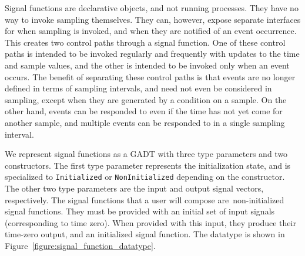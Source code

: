 Signal functions are declarative objects, and not running processes. They have
no way to invoke sampling themselves. They can, however, expose separate
interfaces for when sampling is invoked, and when they are notified of an event
occurrence. This creates two control paths through a signal function. One of
these control paths is intended to be invoked regularly and frequently with
updates to the time and sample values, and the other is intended to be invoked
only when an event occurs. The benefit of separating these control paths is that
events are no longer defined in terms of sampling intervals, and need not even
be considered in sampling, except when they are generated by a condition on a
sample. On the other hand, events can be responded to even if the time has not
yet come for another sample, and multiple events can be responded to in a single
sampling interval.

We represent signal functions as a GADT with three type parameters and two 
constructors. The first type parameter represents the initialization state,
and is specialized to {\tt Initialized} or {\tt NonInitialized} depending on the
constructor. The other two type parameters are the input and output signal
vectors, respectively. The signal functions that a user will compose are\
non-initialized signal functions. They must be provided with an initial set of
input signals (corresponding to time zero). When provided with this input, they
produce their time-zero output, and an initialized signal function. The datatype
is shown in Figure~\ref{figure:signal_function_datatype}.

